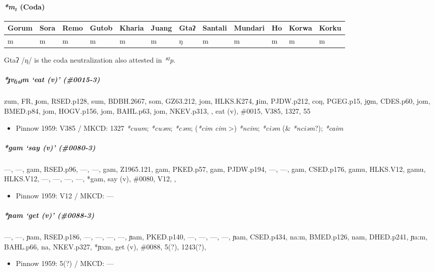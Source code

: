 \documentclass[a4paper,]{article}
\providecommand{\tightlist}{%
  \setlength{\itemsep}{0pt}\setlength{\parskip}{0pt}}
\let\oldparagraph\paragraph
\renewcommand{\paragraph}[1]{\oldparagraph{#1}\mbox{}}
\let\oldsubparagraph\subparagraph
\renewcommand{\subparagraph}[1]{\oldsubparagraph{#1}\mbox{}}
\begin{document}
\paragraph{\texorpdfstring{\emph{*m₁} (Coda)}{*m₁ (Coda)}}\label{m-coda}

\begin{longtable}[]{@{}llllllllllll@{}}
\toprule
Gorum & Sora & Remo & Gutob & Kharia & Juang & Gtaʔ & Santali & Mundari
& Ho & Korwa & Korku\tabularnewline
\midrule
\endhead
m & m & m & m & m & m & ŋ & m & m & m & m & m\tabularnewline
\bottomrule
\end{longtable}

Gtaʔ /ŋ/ is the coda neutralization also attested in \emph{*ˀp}.

\subparagraph{\texorpdfstring{\emph{*ɟv₍₁₀₎m} `eat (v)'
(\#0015-3)}{*ɟv₍₁₀₎m eat (v) (\#0015-3)}}\label{ux25fvm-eat-v-0015-3}

zum, FR, ɟom, RSED.p128, sum, BDBH.2667, som, GZ63.212, jom, HLKS.K274,
ɟim, PJDW.p212, coŋ, PGEG.p15, jo̠m, CDES.p60, jom, BMED.p84, jom,
HOGV.p156, jom, BAHL.p63, jom, NKEV.p313, , eat (v), \#0015, V385, 1327,
55

\begin{itemize}
\tightlist
\item
  Pinnow 1959: V385 / MKCD: 1327 \emph{*cuum}; \emph{*cuəm};
  \emph{*cəm}; (\emph{*cim cim} \textgreater{}) \emph{*ncim};
  \emph{*ciəm} (\& \emph{*nciəm}?); \emph{*caim}
\end{itemize}

\subparagraph{\texorpdfstring{\emph{*gam} `say (v)'
(\#0080-3)}{*gam say (v) (\#0080-3)}}\label{gam-say-v-0080-3}

---, ---, gam, RSED.p96, ---, ---, gam, Z1965.121, gam, PKED.p57, gam,
PJDW.p194, ---, ---, gam, CSED.p176, gamu, HLKS.V12, gamu, HLKS.V12,
---, ---, ---, ---, *gam, say (v), \#0080, V12, ,

\begin{itemize}
\tightlist
\item
  Pinnow 1959: V12 / MKCD: ---
\end{itemize}

\subparagraph{\texorpdfstring{\emph{*ɲam} `get (v)'
(\#0088-3)}{*ɲam get (v) (\#0088-3)}}\label{ux272am-get-v-0088-3}

---, ---, ɲam, RSED.p186, ---, ---, ---, ---, ɲam, PKED.p140, ---, ---,
---, ---, ɲam, CSED.p434, na:m, BMED.p126, nam, DHED.p241, ɲa:m,
BAHL.p66, na, NKEV.p327, *ɲxm, get (v), \#0088, 5(?), 1243(?),

\begin{itemize}
\tightlist
\item
  Pinnow 1959: 5(?) / MKCD: ---
\end{itemize}
\end{document}
